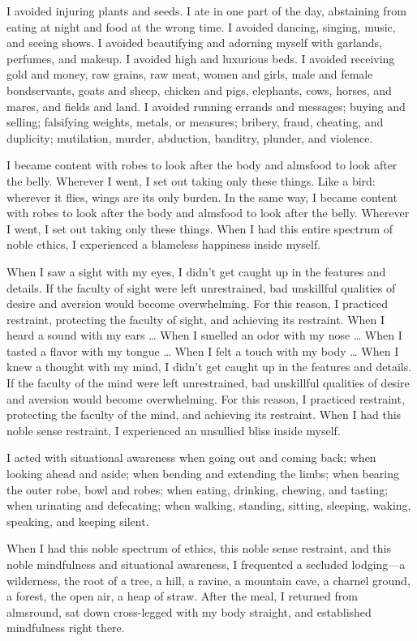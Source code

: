 \documentclass[12pt,openany]{book}%
\begin{document}
I avoided injuring plants and seeds. I ate in one part of the day, abstaining from eating at night and food at the wrong time. I avoided dancing, singing, music, and seeing shows. I avoided beautifying and adorning myself with garlands, perfumes, and makeup. I avoided high and luxurious beds. I avoided receiving gold and money, raw grains, raw meat, women and girls, male and female bondservants, goats and sheep, chicken and pigs, elephants, cows, horses, and mares, and fields and land. I avoided running errands and messages; buying and selling; falsifying weights, metals, or measures; bribery, fraud, cheating, and duplicity; mutilation, murder, abduction, banditry, plunder, and violence. 

I became content with robes to look after the body and almsfood to look after the belly. Wherever I went, I set out taking only these things. Like a bird: wherever it flies, wings are its only burden. In the same way, I became content with robes to look after the body and almsfood to look after the belly. Wherever I went, I set out taking only these things. When I had this entire spectrum of noble ethics, I experienced a blameless happiness inside myself. 

When I saw a sight with my eyes, I didn’t get caught up in the features and details. If the faculty of sight were left unrestrained, bad unskillful qualities of desire and aversion would become overwhelming. For this reason, I practiced restraint, protecting the faculty of sight, and achieving its restraint. When I heard a sound with my ears … When I smelled an odor with my nose … When I tasted a flavor with my tongue … When I felt a touch with my body … When I knew a thought with my mind, I didn’t get caught up in the features and details. If the faculty of the mind were left unrestrained, bad unskillful qualities of desire and aversion would become overwhelming. For this reason, I practiced restraint, protecting the faculty of the mind, and achieving its restraint. When I had this noble sense restraint, I experienced an unsullied bliss inside myself. 

I acted with situational awareness when going out and coming back; when looking ahead and aside; when bending and extending the limbs; when bearing the outer robe, bowl and robes; when eating, drinking, chewing, and tasting; when urinating and defecating; when walking, standing, sitting, sleeping, waking, speaking, and keeping silent. 

When I had this noble spectrum of ethics, this noble sense restraint, and this noble mindfulness and situational awareness, I frequented a secluded lodging—a wilderness, the root of a tree, a hill, a ravine, a mountain cave, a charnel ground, a forest, the open air, a heap of straw. After the meal, I returned from almsround, sat down cross-legged with my body straight, and established mindfulness right there. 
\end{document}
